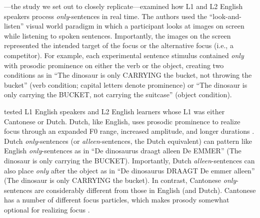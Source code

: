 \textcite{ge2021a}---the study we set out to closely replicate---examined how L1 and L2 English speakers process \textit{only}-sentences in real time. The authors used the “look-and-listen” visual world paradigm in which a participant looks at images on screen while listening to spoken sentences. Importantly, the images on the screen represented the intended target of the focus or the alternative focus (i.e., a competitor). For example, each experimental sentence stimulus contained \textit{only} with prosodic prominence on either the verb or the object, creating two conditions as in “The dinosaur is only CARRYING the bucket, not throwing the bucket” (verb condition; capital letters denote prominence) or “The dinosaur is only carrying the BUCKET, not carrying the suitcase” (object condition).

\textcite{ge2021a} tested L1 English speakers and L2 English learners whose L1 was either Cantonese or Dutch. Dutch, like English, uses prosodic prominence to realize focus through an expanded F0 range, increased amplitude, and longer durations \parencite{dimitrova2010focus}. Dutch \textit{only}-sentences (or \textit{alleen}-sentences, the Dutch equivalent) can pattern like English \textit{only}-sentences as in “De dinosaurus draagt alleen De EMMER” (The dinosaur is only carrying the BUCKET). Importantly, Dutch \textit{alleen}-sentences can also place \textit{only} after the object as in “De dinosaurus DRAAGT De emmer alleen” (The dinosaur is only CARRYING the bucket). In contrast, Cantonese \textit{only}-sentences are considerably different from those in English (and Dutch). Cantonese has a number of different focus particles, which makes prosody somewhat optional for realizing focus \parencite{lee2019focus, wu2010prosodic, ge2024bilingual, fung2000final}. 

